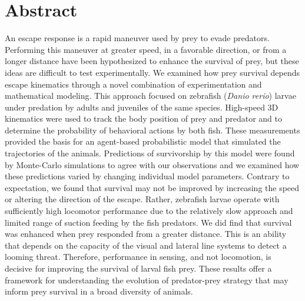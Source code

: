 \documentclass[]{rsos}%
\begin{document}
\section*{Abstract}
An escape response is a rapid maneuver used by prey to evade predators. 
Performing this maneuver at greater speed, in a favorable direction, or from a longer distance have been hypothesized to enhance the survival of prey, but these ideas are difficult to test experimentally.
We examined how prey survival depends escape kinematics through a novel combination of experimentation and mathematical modeling. 
This approach focused on zebrafish (\textit{Danio rerio}) larvae under predation by adults and juveniles of the same species.
High-speed 3D kinematics were used to track the body position of prey and predator and to determine the probability of behavioral actions by both fish.
These measurements provided the basis for an agent-based probabilistic model that simulated the trajectories of the animals.
Predictions of survivorship by this model were found by Monte-Carlo simulations to agree with our observations and we examined how these predictions varied by changing individual model parameters.
Contrary to expectation, we found that survival may not be improved by increasing the speed or altering the direction of the escape.
Rather, zebrafish larvae operate with sufficiently high locomotor performance due to the relatively slow approach and limited range of suction feeding by the fish predators.
We did find that survival was enhanced when prey responded from a greater distance.
This is an ability that depends on the capacity of the visual and lateral line systems to detect a looming threat.
Therefore, performance in sensing, and not locomotion, is decisive for improving the survival of larval fish prey.
These results offer a framework for understanding the evolution of predator-prey strategy that may inform prey survival in a broad diversity of animals.
\end{document}
